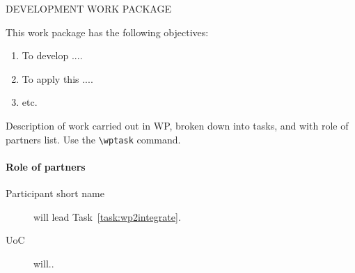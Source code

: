 
\begin{workpackage}{DEVELOPMENT WORK PACKAGE}
  \label{wp:develop} %



  \makewptable %
    
  \begin{wpobjectives}
    This work package has the following objectives:
    \begin{enumerate}
    \item To develop ....
    \item To apply this ....
    \item etc.
    \end{enumerate}
  \end{wpobjectives}
  
  \begin{wpdescription}
 
    Description of work carried out in WP, broken down into tasks, and
    with role of partners list. Use the \texttt{\textbackslash wptask} command.

    
    \paragraph{Role of partners}
    \begin{description}
    \item[Participant short name] will lead Task~\ref{task:wp2integrate}.
    \item[UoC] will..
    \end{description}
  \end{wpdescription}
  

\end{workpackage}
